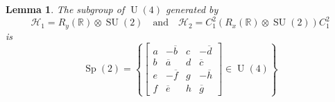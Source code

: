 \documentclass[10pt,a4paper]{amsart}
\newtheorem{lemma}{Lemma}
\renewcommand{\H}{\mathcal{H}}
\newcommand{\RR}{\mathbb{R}}
\newcommand{\SU}{\operatorname{SU}}
\newcommand{\Sp}{\operatorname{Sp}}
\newcommand{\U}{\operatorname{U}}
\begin{document}
\begin{lemma} \label{lem:real-gates-sp} The subgroup of $\U(4)$ generated by
\begin{equation*}
\H_1 = R_y(\RR) \otimes \SU(2) \quad \text{and} \quad \H_2 = C_1^2 (R_x(\RR) \otimes \SU(2))C_1^2
\end{equation*}
is
\begin{equation*}
\Sp(2) = \left\{\left[\begin{smallmatrix} a & -\overline{b} & c & -\overline{d} \\
								   b & \overline{a} & d & \overline{c}\\
								   e & -\overline{f} & g & -\overline{h}\\
							       f & \overline{e} & h & \overline{g}
\end{smallmatrix}\right] \in \U(4) \right\}
\end{equation*}
\end{lemma}
\end{document}
